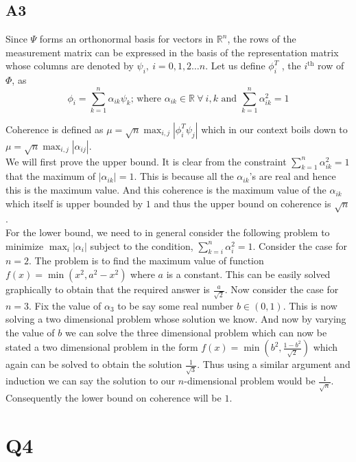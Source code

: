 \documentclass{article}
\begin{document}
\subsection*{A3}

Since $\Psi$ forms an orthonormal basis for vectors in $\mathbb{R}^n$, the rows of the measurement matrix can be expressed in the basis of the representation matrix whose columns are denoted by $\psi_i , \ i = 0,1,2 \dots n $. Let us define $\phi_i^T$ , the $i^{\text{th}}$ row of $\Phi$, as $$ \phi_i = \sum_{k=1}^n \alpha_{ik} \psi_k  \text{; where } \alpha_{ik}   \in  \mathbb{R} \ \forall \ i,k \text{ and } \sum_{k=1}^n \alpha_{ik}^2 = 1 $$ 

Coherence is defined as $ \mu = \sqrt{n} \operatorname*{\max}_{i,j} | \phi_i^T \psi_j | $ which in our context boils down to $\mu = \sqrt{n} \operatorname*{\max}_{i,j} |\alpha_{ij}| $. \\

We will first prove the upper bound. It is clear from the constraint $\sum_{k=1}^n \alpha_{ik}^2 = 1$ that the maximum of $|\alpha_{ik}| = 1$. This is because all the $\alpha_{ik}$'s are real and hence this is the maximum value. And this coherence is the maximum value of the $\alpha_{ik}$ which itself is upper bounded by $1$ and thus the upper bound on coherence is $\sqrt{n}$. \\

For the lower bound, we need to in general consider the following problem  to minimize $ \operatorname*{\max}_{i} |\alpha_i| $ subject to the condition, $\sum_{k=i}^n \alpha_{i}^2 = 1$. Consider the case for $n=2$. The problem is to find the maximum value of function $f(x) = \operatorname*{\min} (x^2, a^2 - x^2) $ where $a$ is a constant. This can be easily solved graphically to obtain that the required answer is $\frac{a}{\sqrt{2}}$. Now consider the case for $n=3$. Fix the value of $\alpha_3$  to be say some real number $b \in (0,1)$. This is now solving a two dimensional problem whose solution we know. And now by varying the value of $b$ we can solve the three dimensional problem which can now be stated a two dimensional problem in the form $f(x) = \operatorname*{\min} (b^2, \frac{1 - b^2}{\sqrt{2}}) $ which again can be solved to obtain the solution $ \frac{1}{\sqrt{3}}$. Thus using a similar argument and induction we can say the solution to our $n$-dimensional problem would be $\frac{1}{\sqrt{n}}$. Consequently the lower bound on coherence will be $1$.


\section*{Q4}
\end{document}
